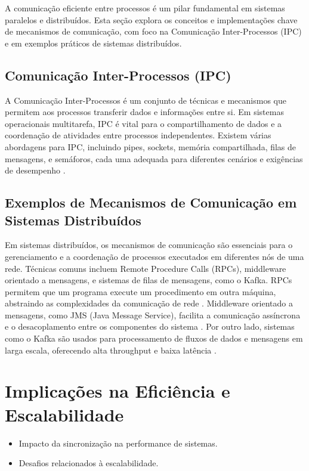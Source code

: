 \documentclass[conference]{IEEEtran}
\begin{document}
A comunicação eficiente entre processos é um pilar fundamental 
em sistemas paralelos e distribuídos. Esta seção explora os conceitos 
e implementações chave de mecanismos de comunicação, 
com foco na Comunicação Inter-Processos (IPC) e 
em exemplos práticos de sistemas distribuídos.

\subsection{Comunicação Inter-Processos (IPC)}
A Comunicação Inter-Processos é um conjunto de técnicas e mecanismos 
que permitem aos processos transferir dados e informações entre si. 
Em sistemas operacionais multitarefa, IPC é vital para o compartilhamento de dados 
e a coordenação de atividades entre processos independentes. 
Existem várias abordagens para IPC, incluindo pipes, sockets, memória compartilhada, 
filas de mensagens, e semáforos, cada uma adequada para diferentes cenários 
e exigências de desempenho \cite{tanenbaum2007modernos}.

\subsection{Exemplos de Mecanismos de Comunicação em Sistemas Distribuídos}
Em sistemas distribuídos, os mecanismos de comunicação são essenciais 
para o gerenciamento e a coordenação de processos executados 
em diferentes nós de uma rede. 
Técnicas comuns incluem Remote Procedure Calls (RPCs), middleware orientado a mensagens, 
e sistemas de filas de mensagens, como o Kafka. 
RPCs permitem que um programa execute um procedimento em outra máquina, 
abstraindo as complexidades da comunicação de rede \cite{birrell1984rpc}. 
Middleware orientado a mensagens, como JMS (Java Message Service), 
facilita a comunicação assíncrona e o desacoplamento 
entre os componentes do sistema \cite{hohpe2004enterprise}. 
Por outro lado, sistemas como o Kafka são usados para processamento 
de fluxos de dados e mensagens em larga escala, 
oferecendo alta throughput e baixa latência \cite{kreps2011kafka}.

\section{Implicações na Eficiência e Escalabilidade}
\begin{itemize}
    \item Impacto da sincronização na performance de sistemas.
    \item Desafios relacionados à escalabilidade.
\end{itemize}
\end{document}

